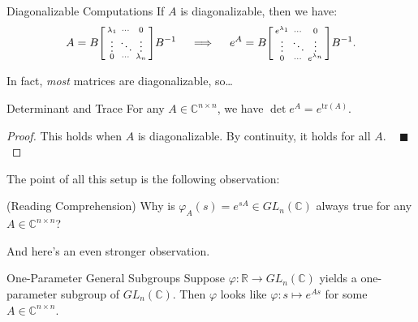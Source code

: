 \begin{theorem}{Diagonalizable Computations}
    If $A$ is diagonalizable, then we have:
    \[ A = B \begin{bsmallmatrix} \lambda_1 & \cdots & 0 \\ \vdots & \ddots & \vdots \\ 0 & \cdots & \lambda_n \end{bsmallmatrix}B^{-1} ~~~ \implies ~~~ e^A = B \begin{bsmallmatrix} e^{\lambda_1} & \cdots & 0 \\ \vdots & \ddots & \vdots \\ 0 & \cdots & e^{\lambda_n} \end{bsmallmatrix} B^{-1}. \]  \vspace{-0.5cm}
\end{theorem}

In fact, \emph{most} matrices are diagonalizable, so\dots

\begin{theorem}{Determinant and Trace}
    For any $A \in \mathbb{C}^{n \times n}$, we have $\det e^A = e^{\mathrm{tr}(A)}$.
\end{theorem}

\begin{proof}
    This holds when $A$ is diagonalizable.  By continuity, it holds for all $A$. ~ $\blacksquare$
\end{proof}

The point of all this setup is the following observation:


\begin{remark}
    (Reading Comprehension) Why is $\varphi_A(s) = e^{sA} \in GL_n(\mathbb{C})$ always true for any $A \in \mathbb{C}^{n \times n}$?
\end{remark}

And here's an even stronger observation.

\begin{theorem}{One-Parameter General Subgroups}
    Suppose $\varphi : \mathbb{R} \to GL_n(\mathbb{C})$ yields a one-parameter subgroup of $GL_n(\mathbb{C})$.  Then $\varphi$ looks like $\varphi: s \mapsto e^{As}$ for some $A \in \mathbb{C}^{n \times n}$.
\end{theorem}

